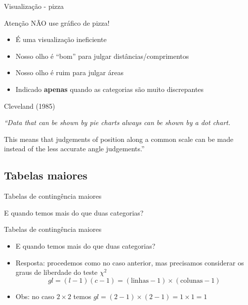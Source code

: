\documentclass{beamer}
\begin{document}
\begin{frame}{\scriptsize Visualização - pizza}
  \begin{block}{Atenção}
    NÃO use gráfico de pizza!
  \end{block}
  \begin{itemize}
    \scriptsize
  \item É uma visualização ineficiente
  \item Nosso olho é ``bom'' para julgar distâncias/comprimentos
  \item Nosso olho é ruim para julgar áreas
  \item Indicado {\bf apenas} quando as categorias são muito discrepantes
  \end{itemize}
  \begin{block}{Cleveland (1985)}
    \scriptsize
    {\em ``Data that can be shown by pie charts always can be shown by a dot chart.

      \bigskip
      This means that judgements of position along a common scale can be made instead of the less accurate angle judgements.''}
  \end{block}
\end{frame}

\subsection{Tabelas maiores}

\begin{frame}{\scriptsize Tabelas de contingência maiores}
  \begin{center}
    E quando temos mais do que duas categorias?
  \end{center}
\end{frame}

\begin{frame}{\scriptsize Tabelas de contingência maiores}
  \small
  \begin{itemize}
    \footnotesize
  \item E quando temos mais do que duas categorias?
    \bigskip
  \item Resposta: procedemos como no caso anterior, mas precisamos
    considerar os \alert{graus de liberdade} do teste $\chi^2$
    \begin{displaymath}
        gl = (l-1)(c-1) = (\text{linhas} -1)\times (\text{colunas}-1)
    \end{displaymath}
    \bigskip
  \item Obs: no caso $2 \times 2$ temos $gl = (2-1) \times (2-1)=1
    \times 1 = 1$
  \end{itemize}
\end{frame}
\end{document}
